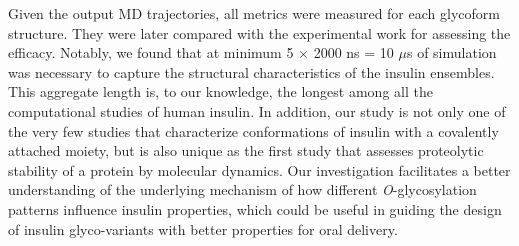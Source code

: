 \documentclass[9pt]{elife}
\begin{document}
Given the output MD trajectories, all metrics were measured for each glycoform structure. They were later compared with the experimental work for assessing the efficacy. Notably, we found that at minimum 5 $\times$ 2000 ns = 10 $\mu$s of simulation was necessary to capture the structural characteristics of the insulin ensembles. This aggregate length is, to our knowledge, the longest among all the computational studies of human insulin. In addition, our study is not only one of the very few studies that characterize conformations of insulin with a covalently attached moiety, but is also unique as the first study that assesses proteolytic stability of a protein by molecular dynamics. Our investigation facilitates a better understanding of the underlying mechanism of how different \emph{O}-glycosylation patterns influence insulin properties, which could be useful in guiding the design of insulin glyco-variants with better properties for oral delivery.
\end{document}
